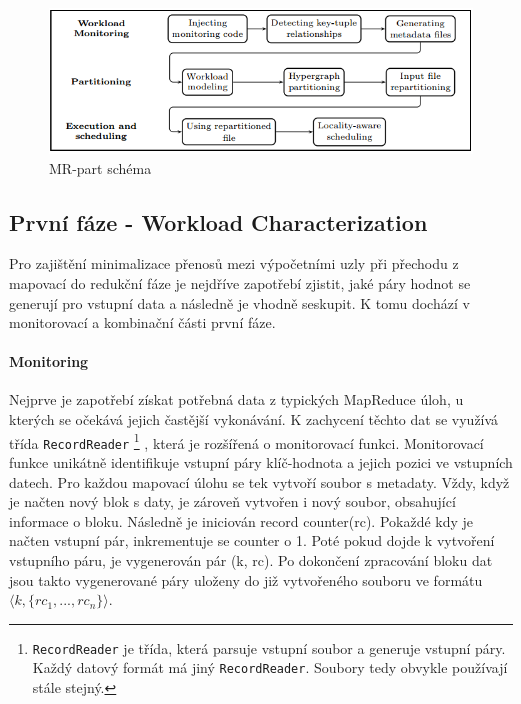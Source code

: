 \documentclass[thesis=M,czech]{FITthesis}[2012/06/26]
\begin{document}
\begin{figure}\centering
	\includegraphics[width=1\textwidth, angle=0]{files/MR-part}
	\caption[MR-part schéma]{MR-part schéma}\label{fig:MR-part}
\end{figure}

\subsection{První fáze - Workload Characterization}
Pro zajištění minimalizace přenosů mezi výpočetními uzly při přechodu z mapovací do redukční fáze je nejdříve zapotřebí zjistit, jaké páry hodnot se generují pro vstupní data a následně je vhodně seskupit. K tomu dochází v monitorovací a kombinační části první fáze.
\paragraph{Monitoring}
Nejprve je zapotřebí získat potřebná data z typických MapReduce úloh, u kterých se očekává jejich častější vykonávání. K zachycení těchto dat se využívá třída  \texttt{RecordReader} \footnote{\texttt{RecordReader} je třída, která parsuje vstupní soubor a generuje vstupní páry. Každý datový formát má jiný \texttt{RecordReader}. Soubory tedy obvykle používají stále stejný.} , která je rozšířená o  monitorovací funkci. Monitorovací funkce unikátně identifikuje vstupní páry klíč-hodnota a jejich pozici ve vstupních datech. Pro každou mapovací úlohu se tek vytvoří soubor s metadaty. Vždy, když je načten nový blok s daty, je zároveň vytvořen i nový soubor, obsahující informace o bloku. Následně je iniciován record counter(rc). Pokaždé kdy je načten vstupní pár, inkrementuje se counter o 1. Poté pokud dojde k vytvoření vstupního páru, je vygenerován pár (k, rc). Po dokončení zpracování bloku dat jsou takto vygenerované páry uloženy do již vytvořeného souboru ve formátu $\langle k,\{rc_1, ..., rc_n\}\rangle$.
\end{document}
